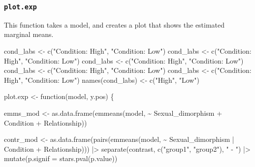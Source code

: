 \documentclass[
  bookmarksnumbered]{article}
\newenvironment{Shaded}{\begin{snugshade}}{\end{snugshade}}
\newcommand{\AttributeTok}[1]{\textcolor[rgb]{0.80,0.80,0.80}{#1}}
\newcommand{\ControlFlowTok}[1]{\textcolor[rgb]{0.94,0.87,0.69}{#1}}
\newcommand{\FunctionTok}[1]{\textcolor[rgb]{0.94,0.94,0.56}{#1}}
\newcommand{\NormalTok}[1]{\textcolor[rgb]{0.80,0.80,0.80}{#1}}
\newcommand{\OtherTok}[1]{\textcolor[rgb]{0.94,0.94,0.56}{#1}}
\newcommand{\SpecialCharTok}[1]{\textcolor[rgb]{0.86,0.64,0.64}{#1}}
\newcommand{\StringTok}[1]{\textcolor[rgb]{0.80,0.58,0.58}{#1}}
\begin{document}
\subsubsection{\texorpdfstring{\texttt{plot.exp}}{plot.exp}}\label{plot.exp}

This function takes a model, and creates a plot that shows the estimated marginal means.

\begin{Shaded}
\begin{Highlighting}[]
\NormalTok{cond\_labs }\OtherTok{\textless{}{-}} \FunctionTok{c}\NormalTok{(}\StringTok{"Condition: High"}\NormalTok{, }\StringTok{"Condition: Low"}\NormalTok{)}
\NormalTok{cond\_labs }\OtherTok{\textless{}{-}} \FunctionTok{c}\NormalTok{(}\StringTok{"Condition: High"}\NormalTok{, }\StringTok{"Condition: Low"}\NormalTok{)}
\NormalTok{cond\_labs }\OtherTok{\textless{}{-}} \FunctionTok{c}\NormalTok{(}\StringTok{"Condition: High"}\NormalTok{, }\StringTok{"Condition: Low"}\NormalTok{)}
\NormalTok{cond\_labs }\OtherTok{\textless{}{-}} \FunctionTok{c}\NormalTok{(}\StringTok{"Condition: High"}\NormalTok{, }\StringTok{"Condition: Low"}\NormalTok{)}
\NormalTok{cond\_labs }\OtherTok{\textless{}{-}} \FunctionTok{c}\NormalTok{(}\StringTok{"Condition: High"}\NormalTok{, }\StringTok{"Condition: Low"}\NormalTok{)}
\FunctionTok{names}\NormalTok{(cond\_labs) }\OtherTok{\textless{}{-}} \FunctionTok{c}\NormalTok{(}\StringTok{"High"}\NormalTok{, }\StringTok{"Low"}\NormalTok{)}

\NormalTok{plot.exp }\OtherTok{\textless{}{-}} \ControlFlowTok{function}\NormalTok{(model, y.pos) \{}
  
\NormalTok{  emms\_mod }\OtherTok{\textless{}{-}} \FunctionTok{as.data.frame}\NormalTok{(}\FunctionTok{emmeans}\NormalTok{(model,}
                                   \SpecialCharTok{\textasciitilde{}}\NormalTok{ Sexual\_dimorphism }\SpecialCharTok{+}\NormalTok{ Condition }\SpecialCharTok{+}\NormalTok{ Relationship))}
  
\NormalTok{  contr\_mod }\OtherTok{\textless{}{-}} \FunctionTok{as.data.frame}\NormalTok{(}\FunctionTok{pairs}\NormalTok{(}\FunctionTok{emmeans}\NormalTok{(model,}
                                          \SpecialCharTok{\textasciitilde{}}\NormalTok{ Sexual\_dimorphism }\SpecialCharTok{|}\NormalTok{ Condition }\SpecialCharTok{+}\NormalTok{ Relationship))) }\SpecialCharTok{|\textgreater{}}
    \FunctionTok{separate}\NormalTok{(contrast, }\FunctionTok{c}\NormalTok{(}\StringTok{"group1"}\NormalTok{, }\StringTok{"group2"}\NormalTok{), }\StringTok{" {-} "}\NormalTok{) }\SpecialCharTok{|\textgreater{}}
    \FunctionTok{mutate}\NormalTok{(}\AttributeTok{p.signif =} \FunctionTok{stars.pval}\NormalTok{(p.value))}
  

\end{Highlighting}
\end{Shaded}
\end{document}
